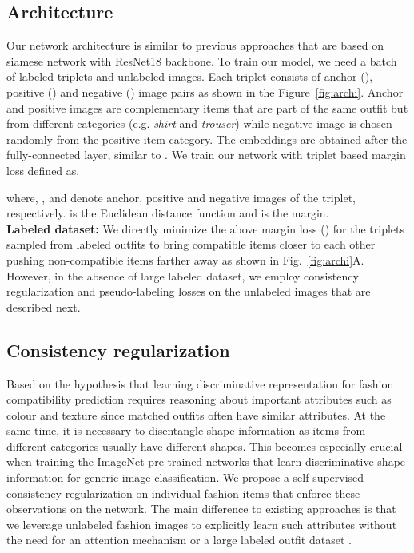 \documentclass[sigconf]{acmart}
\begin{document}
\subsection{Architecture} Our network architecture is similar to previous approaches \cite{eccv2018learning} that are based on siamese network \cite{siamese2017} with ResNet18 backbone. To train our model, we need a batch of labeled triplets and unlabeled images. Each triplet consists of anchor (), positive () and negative () image pairs as shown in the Figure~\ref{fig:archi}. Anchor and positive images are complementary items that are part of the same outfit but from different categories (e.g. {\em shirt} and {\em trouser}) while negative image is chosen randomly from the positive item category. The embeddings  are obtained after the fully-connected layer, similar to \cite{eccv2018learning}. We train our network with triplet based margin loss defined as,

where, ,  and  denote anchor, positive and negative images of the triplet, respectively.  is the Euclidean distance function and  is the margin.\\

{\bf Labeled dataset:} We directly minimize the above margin loss () for the triplets sampled from labeled outfits to bring compatible items closer to each other pushing non-compatible items farther away as shown in Fig.~\ref{fig:archi}{A}. However, in the absence of large labeled dataset, we employ consistency regularization and pseudo-labeling losses on the unlabeled images that are described next.



\subsection{Consistency regularization}

\label{sec:l_ss}

Based on the hypothesis that learning discriminative representation for fashion compatibility prediction requires reasoning about important attributes such as colour and texture since matched outfits often have similar attributes. At the same time, it is necessary to disentangle shape information as items from different categories usually have different shapes. This becomes especially crucial when training the ImageNet pre-trained networks that learn discriminative shape information \cite{simclr, moco} for generic image classification. We propose a self-supervised consistency regularization on individual fashion items that enforce these observations on the network. The main difference to existing approaches is that we leverage unlabeled fashion images to explicitly learn such attributes without the need for an attention mechanism \cite{iccv2019learning} or a large labeled outfit dataset \cite{iccv2019learning,cvpr2020fashion}.
\end{document}
